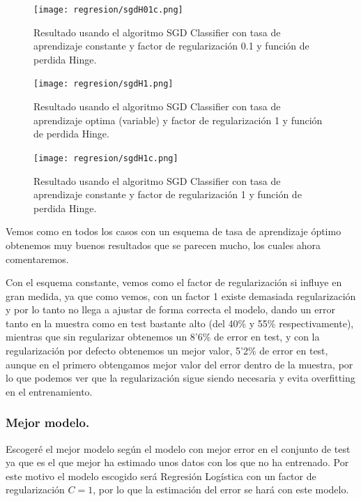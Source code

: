 \documentclass[12pt, spanish]{article}
\begin{document}
\begin{figure}[H]
	\centering
	\hspace*{-1cm}\texttt{[image: regresion/sgdH01c.png]}
	\caption{Resultado usando el algoritmo SGD Classifier con tasa de aprendizaje constante y factor de regularización 0.1 y función de perdida Hinge.}
	\label{SGDL001}
\end{figure}


\begin{figure}[H]
	\centering
	\hspace*{-1cm}\texttt{[image: regresion/sgdH1.png]}
	\caption{Resultado usando el algoritmo SGD Classifier con tasa de aprendizaje optima (variable) y factor de regularización 1 y función de perdida Hinge.}
	\label{SGDL001}
\end{figure}

\begin{figure}[H]
	\centering
	\hspace*{-1cm}\texttt{[image: regresion/sgdH1c.png]}
	\caption{Resultado usando el algoritmo SGD Classifier con tasa de aprendizaje constante y factor de regularización 1 y función de perdida Hinge.}
	\label{SGDL001}
\end{figure}


Vemos como en todos los casos con un esquema de tasa de aprendizaje óptimo obtenemos muy buenos resultados que se parecen mucho, los cuales ahora comentaremos.

Con el esquema constante, vemos como el factor de regularización si influye en gran medida, ya que como vemos, con un factor 1 existe demasiada regularización y por lo tanto no llega a ajustar de forma correcta el modelo, dando un error tanto en la muestra como en test bastante alto (del 40\% y 55\% respectivamente), mientras que sin regularizar obtenemos un 8'6\% de error en test, y con la regularización por defecto obtenemos un mejor valor, 5'2\% de error en test, aunque en el primero obtengamos mejor valor del error dentro de la muestra, por lo que podemos ver que la regularización sigue siendo necesaria y evita overfitting en el entrenamiento.


\subsubsection{Mejor modelo.}

Escogeré el mejor modelo según el modelo con mejor error en el conjunto de test ya que es el que mejor ha estimado unos datos con los que no ha entrenado. Por este motivo el modelo escogido será Regresión Logística con un factor de regularización $C=1$, por lo que la estimación del error se hará con este modelo.
\end{document}

